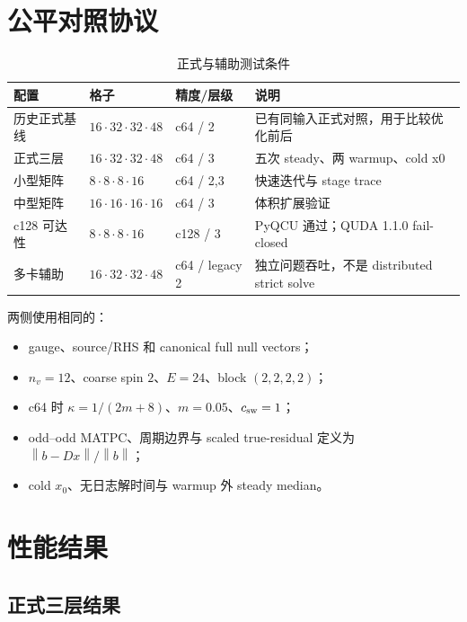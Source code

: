 \documentclass[UTF8,a4paper,11pt]{ctexart}
\newcommand{\norm}[1]{\left\lVert#1\right\rVert}
\begin{document}
\section{公平对照协议}

\begin{table}[htbp]
\centering
\caption{正式与辅助测试条件}
\small
\begin{tabularx}{0.98\textwidth}{@{}lL{0.20\textwidth}L{0.20\textwidth}Y@{}}
\toprule
配置 & 格子 & 精度/层级 & 说明 \\
\midrule
历史正式基线 & $16\cdot32\cdot32\cdot48$ & c64 / 2 &
已有同输入正式对照，用于比较优化前后 \\
正式三层 & $16\cdot32\cdot32\cdot48$ & c64 / 3 &
五次 steady、两 warmup、cold x0 \\
小型矩阵 & $8\cdot8\cdot8\cdot16$ & c64 / 2,3 &
快速迭代与 stage trace \\
中型矩阵 & $16\cdot16\cdot16\cdot16$ & c64 / 3 &
体积扩展验证 \\
c128 可达性 & $8\cdot8\cdot8\cdot16$ & c128 / 3 &
PyQCU 通过；QUDA 1.1.0 fail-closed \\
多卡辅助 & $16\cdot32\cdot32\cdot48$ & c64 / legacy 2 &
独立问题吞吐，不是 distributed strict solve \\
\bottomrule
\end{tabularx}
\end{table}

两侧使用相同的：

\begin{itemize}
  \item gauge、source/RHS 和 canonical full null vectors；
  \item $n_v=12$、coarse spin $2$、$E=24$、block $(2,2,2,2)$；
  \item c64 时 $\kappa=1/(2m+8)$、$m=0.05$、$c_{\rm sw}=1$；
  \item odd--odd MATPC、周期边界与 scaled true-residual 定义为
        $\norm{b-Dx}/\norm{b}$；
  \item cold $x_0$、无日志解时间与 warmup 外 steady median。
\end{itemize}

\section{性能结果}

\subsection{正式三层结果}
\end{document}

